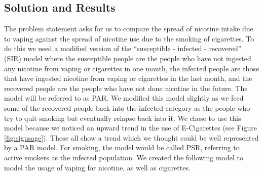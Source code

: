 \documentclass[12pt,letterpaper]{article}
\begin{document}
\subsection{Solution and Results}
The problem statement asks for us to compare the spread of nicotine intake due to vaping against the spread of nicotine use due to the smoking of cigarettes. To do this we used a modified version of the “susceptible - infected - recovered” (SIR) model where the susceptible people are the people who have not ingested any nicotine from vaping or cigarettes in one month, the infected people are those that have ingested nicotine from vaping or cigarettes in the last month, and the recovered people are the people who have not done nicotine in the future. The model will be referred to as PAR. We modified this model slightly as we feed some of the recovered people back into the infected category as the people who try to quit smoking but eventually relapse back into it. We chose to use this model because we noticed an upward trend in the use of E-Cigarettes (see Figure \ref{fig:cigusage}). These all show a trend which we thought could be well represented by a PAR model. For smoking, the model would be called PSR, referring to active smokers as the infected population. We created the following model to model the usage of vaping for nicotine, as well as cigarettes.
\end{document}

